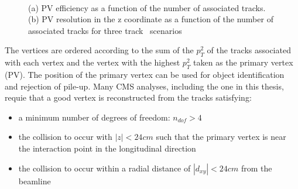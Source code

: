 \begin{figure}[hbt]
  \begin{center} 
   ~
   \caption{(a) PV efficiency as a function of the number of associated tracks. (b) PV
   resolution in the z coordinate as a function of the number of associated tracks for three track \pt~scenarios~\cite{tracker_seven}
   \label{fig:pvEffRes} }
  \end{center}
\end{figure}

The vertices are ordered according to the sum of the $p_T^2$ of the tracks associated with each vertex and
the vertex with the highest $p_T^2$ taken as the primary vertex (PV). The position of the primary vertex can
be used for object identification and rejection of pile-up. Many CMS analyses, including the one in this 
thesis, requie that a good vertex is reconstructed from the tracks satisfying:

\begin{itemize}
\item a minimum number of degrees of freedom: $n_{dof} > 4$
\item the collision to occur with $|z| < 24cm$ such that the primary vertex is near the 
interaction point in the longitudinal direction
\item the collision to occur within a radial distance of $|d_{xy}| < 24cm$ from the beamline
\end{itemize}

